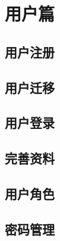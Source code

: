 \part{用户篇}
\label{par:users}


\clearpage
\chapter{用户注册} 
\label{cha:reg}



\clearpage
\chapter{用户迁移} 
\label{cha:transfer}


\clearpage
\chapter{用户登录} 
\label{cha:login}


\clearpage
\chapter{完善资料} 
\label{cha:update}


\clearpage
\chapter{用户角色} 
\label{cha:role}


\clearpage
\chapter{密码管理} 
\label{cha:passwd}


